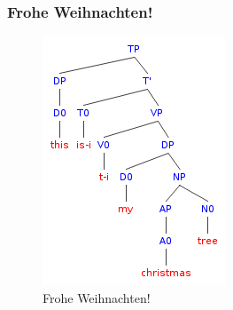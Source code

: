 \begin{frame}
\frametitle{Frohe Weihnachten!}

\begin{figure}
\centering
	\includegraphics[scale=.57]{material/09xmastree}
	\caption{Frohe Weihnachten!}
\end{figure}

\end{frame}

